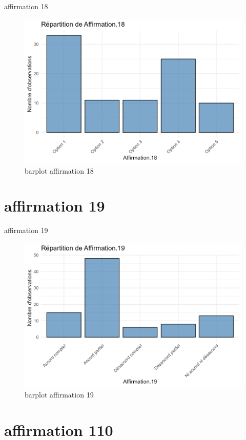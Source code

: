 \documentclass[
]{article}
\begin{document}
affirmation 18

\begin{figure}
\centering
\includegraphics{Image/barplot_Affirmation.18.png}
\caption{barplot affirmation 18}
\end{figure}

\section{affirmation 19}\label{affirmation-19}

affirmation 19

\begin{figure}
\centering
\includegraphics{Image/barplot_Affirmation.19.png}
\caption{barplot affirmation 19}
\end{figure}

\section{affirmation 110}\label{affirmation-110}
\end{document}
